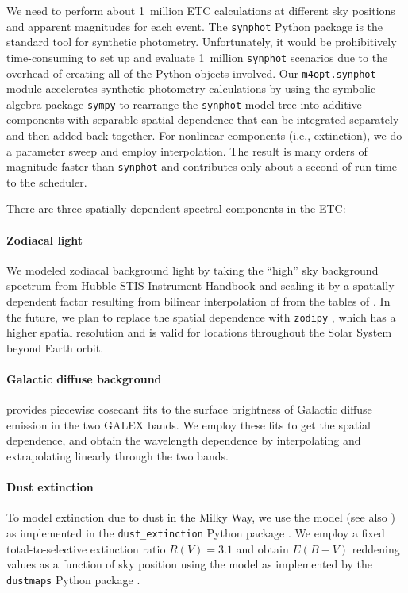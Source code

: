 \documentclass[twocolumn,times]{aastex631}
\begin{document}
We need to perform about 1~million \ac{ETC} calculations at different sky positions and apparent magnitudes for each event. The \texttt{synphot} Python package \citep{2018ascl.soft11001S} is the standard tool for synthetic photometry. Unfortunately, it would be prohibitively time-consuming to set up and evaluate 1~million \texttt{synphot} scenarios due to the overhead of creating all of the Python objects involved. Our \texttt{m4opt.synphot} module accelerates synthetic photometry calculations by using the symbolic algebra package \texttt{sympy} \citep{10.7717/peerj-cs.103} to rearrange the \texttt{synphot} model tree into additive components with separable spatial dependence that can be integrated separately and then added back together. For nonlinear components (i.e., extinction), we do a parameter sweep and employ interpolation. The result is many orders of magnitude faster than \texttt{synphot} and contributes only about a second of run time to the scheduler.

There are three spatially-dependent spectral components in the \ac{ETC}:

\paragraph{Zodiacal light}
We modeled zodiacal background light by taking the ``high'' sky background spectrum from Hubble \ac{STIS} Instrument Handbook \citep{2024stis.rept....5R} and scaling it by a spatially-dependent factor resulting from bilinear interpolation of from the tables of \citet{1998A&AS..127....1L}. In the future, we plan to replace the spatial dependence with \texttt{zodipy} \citep{2022A&A...666A.107S,2024JOSS....9.6648S}, which has a higher spatial resolution and is valid for locations throughout the Solar System beyond Earth orbit.

\paragraph{Galactic diffuse background}
\citet{2014ApJS..213...32M} provides piecewise cosecant fits to the surface brightness of Galactic diffuse emission in the two GALEX bands. We employ these fits to get the spatial dependence, and obtain the wavelength dependence by interpolating and extrapolating linearly through the two bands.

\paragraph{Dust extinction}
To model extinction due to dust in the Milky Way, we use the \citet{2023ApJ...950...86G} model (see also \citealt{2009ApJ...705.1320G,2019ApJ...886..108F,2021ApJ...916...33G,2022ApJ...930...15D}) as implemented in the \texttt{dust\_extinction} Python package \citep{2024JOSS....9.7023G}. We employ a fixed total-to-selective extinction ratio $R(V) = 3.1$ and obtain $E(B-V)$ reddening values as a function of sky position using the \citet{2016A&A...596A.109P} model as implemented by the \texttt{dustmaps} Python package \citep{2018JOSS....3..695M}.
\end{document}
